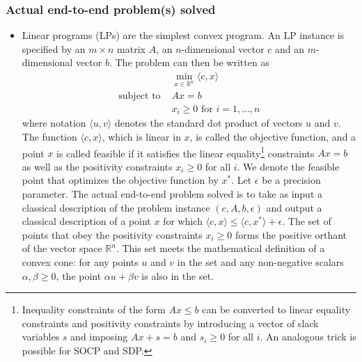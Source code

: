 \begin{refsection}
\subsubsection*{Actual end-to-end problem(s) solved}
\begin{itemize}
\item 
Linear programs (LPs) are the simplest convex program. An LP instance is specified by an $m \times n$ matrix $A$, an $n$-dimensional vector $c$ and an $m$-dimensional vector $b$. The problem can then be written as 
\begin{equation}\label{eq:LP}
    \begin{split}
        &\min_{x \in \mathbb{R}^n} \langle c, x \rangle \\
        \text{subject to } & Ax=b \\
        & x_i \geq 0 \text{ for } i=1,\ldots,n
    \end{split}
\end{equation}
where notation $\langle u, v \rangle$ denotes the standard dot product of vectors $u$ and $v$. 
The function $\langle c, x\rangle $, which is linear in $x$, is called the objective function, and a point $x$ is called feasible if it satisfies the linear equality\footnote{Inequality constraints of the form $Ax \leq b$ can be converted to linear equality constraints and positivity constraints by introducing a vector of slack variables $s$ and imposing $Ax + s = b$ and $s_i \geq 0$ for all $i$. An analogous trick is possible for SOCP and SDP.} constraints $Ax=b$ as well as the positivity constraints $x_i \geq 0$ for all $i$. We denote the feasible point that optimizes the objective function by $x^*$. Let $\epsilon$ be a precision parameter. The actual end-to-end problem solved is to take as input a classical description of the problem instance $(c,A,b,\epsilon)$ and output a classical description of a point $x$ for which $\langle c, x \rangle \leq \langle c, x^*\rangle + \epsilon$. The set of points that obey the positivity constraints $x_i \geq 0$ forms the positive orthant of the vector space $\mathbb{R}^n$. This set meets the mathematical definition of a convex cone: for any points $u$ and $v$ in the set and any non-negative scalars $\alpha,\beta\geq 0$, the point $\alpha u+\beta v$ is also in the set.  


\end{itemize}
\end{refsection}
